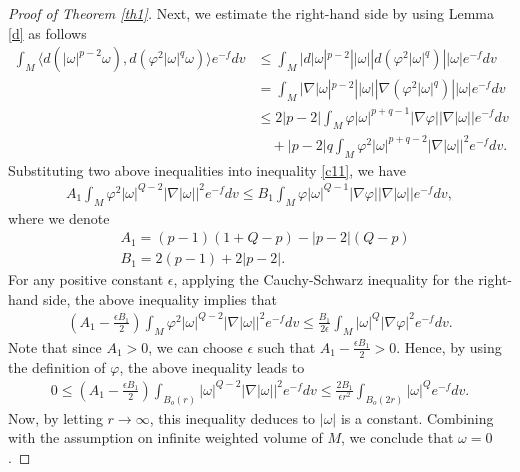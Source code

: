 \documentclass[10pt,a4paper]{amsart}
\numberwithin{equation}{section}
\begin{document}
\begin{proof}[Proof of Theorem \ref{th1}]
Next, we estimate the right-hand side by using Lemma \ref{d} as follows
\begin{align} \label{d1} \nonumber
	\int_M \langle d(|\omega|^{p-2}\omega),d(\varphi^2 |\omega|^q\omega) \rangle e^{-f}dv\nonumber
&\le \int_M |d|\omega|^{p-2}||\omega||d(\varphi^2 |\omega|^q)||\omega| e^{-f}dv\\\nonumber
	&= \int_M |\nabla|\omega|^{p-2}||\omega||\nabla(\varphi^2 |\omega|^q)||\omega| e^{-f}dv\\ 
	&\le 2|p-2| \int_M \varphi |\omega|^{p+q-1}|\nabla \varphi||\nabla|\omega||e^{-f}dv \nonumber\\ & \quad+ 
	|p-2|q \int_M  \varphi^2 |\omega|^{p+q-2}|\nabla|\omega||^2 e^{-f}dv.
\end{align}
	Substituting two above inequalities into inequality \eqref{c11}, we have
	\begin{align}\nonumber
		A_1 \int_M \varphi^2 |\omega|^{Q-2}|\nabla|\omega||^2 e^{-f}dv \le B_1 \int_M \varphi |\omega|^{Q-1} |\nabla \varphi||\nabla|\omega||e^{-f}dv,
	\end{align}
	where we denote
	\begin{align*}
		&A_1=(p-1)(1+Q-p)-|p-2|(Q-p)\\
		&B_1=2(p-1)+2|p-2|.
	\end{align*}
	For any positive constant $\epsilon$, applying the Cauchy-Schwarz inequality for the right-hand side, the above inequality implies that
	\begin{align}\nonumber
		\left(A_1-\frac{\epsilon B_1}{2}\right) \int_M \varphi^2 |\omega|^{Q-2}|\nabla|\omega||^2 e^{-f}dv \le \frac{B_1}{2\epsilon} \int_M |\omega|^{Q} |\nabla \varphi|^2e^{-f}dv.
	\end{align}
	Note that since $A_1>0$, we can choose $\epsilon$ such that $A_1-\frac{\epsilon B_1}{2}>0$. Hence, by using the definition of $\varphi$, the above inequality leads to
		\begin{align}
	0\le	\left(A_1-\frac{\epsilon B_1}{2}\right) \int_{B_o(r)}  |\omega|^{Q-2}|\nabla|\omega||^2 e^{-f}dv \le \frac{2B_1}{\epsilon r^2} \int_{B_o(2r)} |\omega|^{Q} e^{-f}dv.
	\end{align}
	Now, by letting $r \to \infty$, this inequality deduces to $|\omega|$ is a constant. Combining with the assumption on infinite weighted volume of $M$, we conclude that $\omega =0$.
	

\end{proof}
\end{document}
